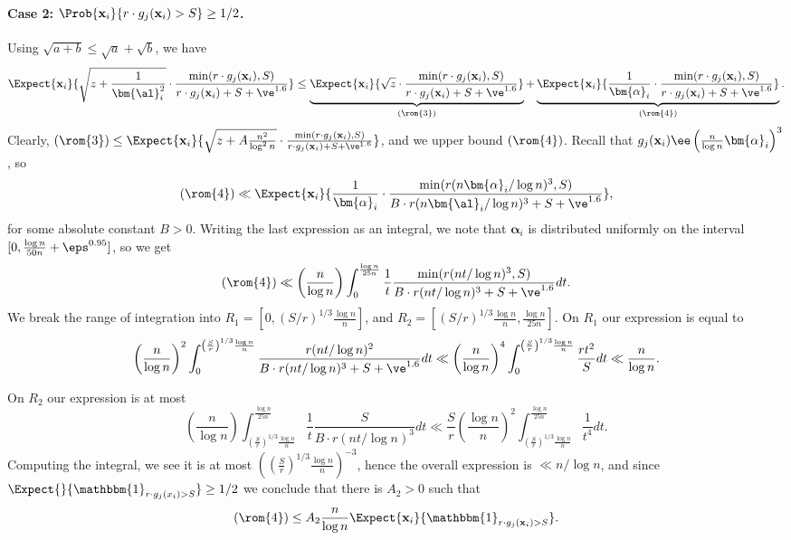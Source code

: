     \paragraph{Case 2: $\Prob{{\bf x}_i}{r\cdot g_j({\bf x}_i)>S} \geq 1/2$.}
    Using $\sqrt{a+b}\leq \sqrt{a}+\sqrt{b}$, we have
    \[
    \Expect{{\bf x}_i}{\sqrt{z+\frac{1}{\bm{\al}_i^2}} \cdot\frac{\min(r\cdot g_j({\bf x}_i),S)}
	{r\cdot g_j({\bf x}_i)+S+\ve^{1.6}}}
    \leq
    \underbrace{\Expect{{\bf x}_i}{\sqrt{z} \cdot\frac{\min(r\cdot g_j({\bf x}_i),S)}
	{r\cdot g_j({\bf x}_i)+S+\ve^{1.6}}}}_{(\rom{3})}
    +\underbrace{\Expect{{\bf x}_i}{\frac{1}{\bm{\alpha}_i} \cdot\frac{\min(r\cdot g_j({\bf x}_i),S)}
	{r\cdot g_j({\bf x}_i)+S+\ve^{1.6}}}}_{(\rom{4})}.
    \]
    Clearly,
    $(\rom{3})\leq \Expect{{\bf x}_i}{\sqrt{z+A\frac{n^2}{\log^2 n}} \cdot \frac{\min(r\cdot g_j({\bf x}_i),S)}{r\cdot g_j({\bf x}_i)+S+\ve^{1.6}}}$,
    and we upper bound $(\rom{4})$. Recall that $g_j({\bf x}_i) \ee \left(\frac{n}{\log n} \bm{\alpha}_i\right)^3$, so
    \[
    (\rom{4})
    \ll \Expect{{\bf x}_i}{\frac{1}{\bm{\alpha}_i} \cdot
    \frac{\min(r(n\bm{\alpha}_i/\log n)^3,S)}{B\cdot r (n\bm{\al}_i/\log n)^3+S+\ve^{1.6}}},
    \]
    for some absolute constant $B>0$. Writing the last expression as an integral, we note
    that $\bm{\alpha}_i$ is distributed uniformly on the interval $[0,\frac{\log n}{50n}+\eps^{0.95}]$, so
    we get
    \[
    (\rom{4})\ll\left(\frac{n}{\log n}\right)\int_{0}^{\frac{\log n}{25 n}}\frac{1}{t}\frac{\min(r(n t/\log n)^3,S)}{B\cdot r (nt/\log n)^3+S+\ve^{1.6}} dt.
    \]
    We break the range of integration into $R_1 = \left[0, (S/r)^{1/3} \frac{\log n}{n}\right]$,
    and $R_2 = \left[(S/r)^{1/3} \frac{\log n}{n},\frac{\log n}{25 n}\right]$. On $R_1$ our expression is equal to
    \[
    \left(\frac{n}{\log n}\right)^2\int_{0}^{\left(\frac{S}{r}\right)^{1/3} \frac{\log n}{n}}\frac{r(n t/\log n)^2}{B\cdot r (nt/\log n)^3+S+\ve^{1.6}} dt
    \ll
    \left(\frac{n}{\log n}\right)^4\int_{0}^{\left(\frac{S}{r}\right)^{1/3} \frac{\log n}{n}}\frac{r t^2}{S} dt
    \ll \frac{n}{\log n}.
    \]
%
%
%
%
%
%
%

    On $R_2$ our expression is at most
    \[
    \left(\frac{n}{\log n}\right)\int_{\left(\frac{S}{r}\right)^{1/3} \frac{\log n}{n}}^{\frac{\log n}{25n}}
    \frac{1}{t}\frac{S}{B\cdot r (nt/\log n)^3} dt
    \ll\frac{S}{r}\left(\frac{\log n}{n}\right)^2\int_{\left(\frac{S}{r}\right)^{1/3} \frac{\log n}{n}}^{\frac{\log n}{25n}}
    \frac{1}{t^4} dt.
    \]
    Computing the integral, we see it is at most $(\left(\frac{S}{r}\right)^{1/3} \frac{\log n}{n})^{-3}$, hence
    the overall expression is $\ll n/\log n$, and since $\Expect{}{\mathbbm{1}_{r\cdot g_j(x_i)>S}}\geq 1/2$ we
    conclude that there is $A_2>0$ such that
    \[
    (\rom{4})\leq A_2 \frac{n}{\log n} \Expect{{\bf x}_i}{\mathbbm{1}_{r\cdot g_j({\bf x}_i)>S}}.
    \]

